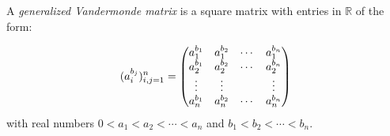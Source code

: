 \documentclass[12pt]{article}
\begin{document}
A \emph{generalized Vandermonde matrix} is a square matrix with entries in $\mathbb{R}$ of the
form:

\[ (a_i^{b_j})_{i,j=1}^n = \begin{pmatrix}
a_1^{b_1} & a_1^{b_2} & \cdots & a_1^{b_n} \cr
a_2^{b_1} & a_2^{b_2} & \cdots & a_2^{b_n} \cr
\vdots & \vdots & & \vdots \cr
a_n^{b_1} & a_n^{b_2} & \cdots & a_n^{b_n}
\end{pmatrix} \]
with real numbers $ 0<a_1<a_2<\cdots<a_n$ and $ b_1<b_2<\cdots<b_n$.
\end{document}
